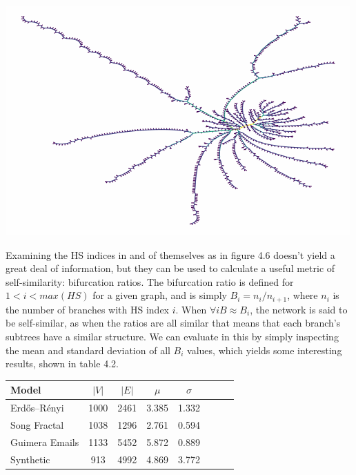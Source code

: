 \documentclass[12pt,twoside]{report}
\begin{document}
\begin{center}
\begin{minipage}{0.45\linewidth}
\end{minipage}%
\hfill
\begin{minipage}{0.45\linewidth}
\includegraphics[width=\linewidth]{figures/1750_bifurcations.png}
\end{minipage}
\end{center}


Examining the HS indices in and of themselves as in figure 4.6 doesn't yield a great deal of information, but they can be used to calculate a useful metric of self-similarity: bifurcation ratios. The bifurcation ratio is defined for $1 < i < max(HS)$ for a given graph, and is simply $B_i = n_i / n_{i+1}$, where $n_i$ is the number of branches with HS index $i$. When $\forall i B \approx B_i$, the network is said to be self-similar, as when the ratios are all similar that means that each branch's subtrees have a similar structure. We can evaluate in this by simply inspecting the mean and standard deviation of all $B_i$ values, which yields some interesting results, shown in table 4.2. \\

\begin{center}
\begin{tabular}{l*{6}{c}r}
Model              & $|V|$ & $|E|$ & $\mu$ & $\sigma$ \\
\hline
Erdős–Rényi    & 1000 & 2461 & 3.385 & 1.332  \\
Song Fractal   & 1038 & 1296 & 2.761 & 0.594  \\
Guimera Emails & 1133 & 5452 & 5.872 & 0.889  \\
Synthetic      & 913  & 4992 & 4.869 & 3.772  \\
\end{tabular}
\end{center}
\end{document}
